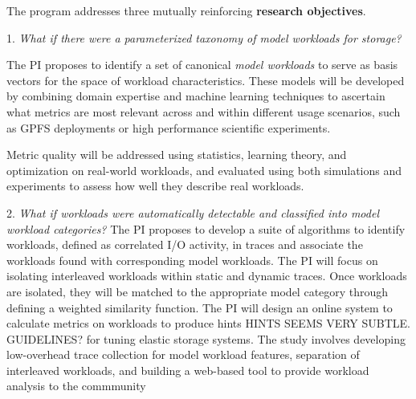 The program addresses three mutually reinforcing \textbf{research objectives}.
\begin{myitemize}

\item[1.]
\emph{What if there were a parameterized taxonomy of \textit{model workloads} for
storage?}

The PI proposes to identify a set of canonical \textit{model workloads} to serve as basis vectors for the space
of workload characteristics.  These models will be developed by combining domain expertise and machine learning techniques to ascertain what
metrics are most relevant across and within different usage scenarios, such as
GPFS deployments or high performance scientific experiments.  

Metric quality will be addressed using
statistics, learning theory, and optimization on 
real-world workloads, and evaluated using both simulations and experiments to assess how well they describe real workloads.

\item[2.]
\emph{What if workloads were automatically detectable and classified into
\textit{model workload} categories?}
The PI proposes to develop a suite of algorithms to identify workloads, defined as correlated I/O activity, in traces and associate the workloads found with corresponding model
workloads.  The PI will focus on isolating interleaved workloads within static and dynamic traces.  Once workloads are isolated, they will be matched to the appropriate model category through defining a weighted similarity function.  The PI will design an online system to calculate metrics on workloads to produce hints HINTS SEEMS VERY SUBTLE. GUIDELINES? for tuning elastic storage systems.
The study involves developing low-overhead trace collection for model workload
features, separation of interleaved workloads, and building a web-based tool to provide workload analysis to the commmunity 


\end{myitemize}

